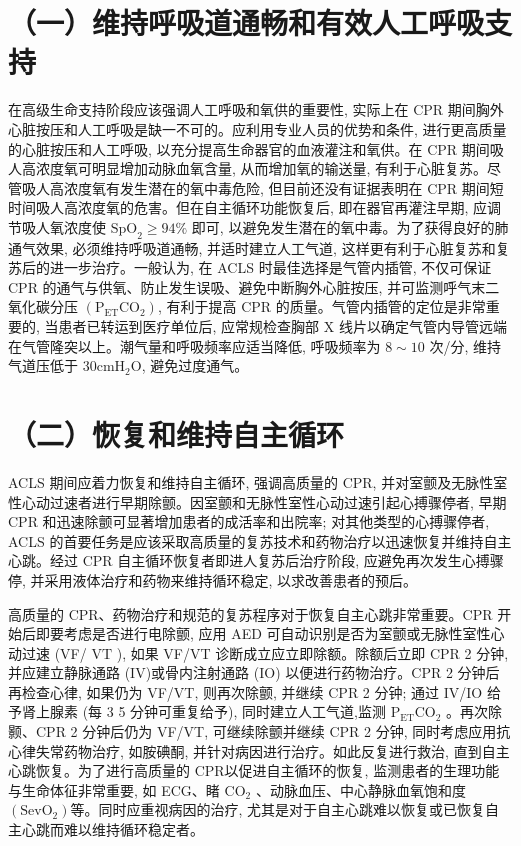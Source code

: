 \documentclass[10pt]{article}
\begin{document}
\section*{（一）维持呼吸道通畅和有效人工呼吸支持}
在高级生命支持阶段应该强调人工呼吸和氧供的重要性, 实际上在 CPR 期间胸外心脏按压和人工呼吸是缺一不可的。应利用专业人员的优势和条件, 进行更高质量的心脏按压和人工呼吸, 以充分提高生命器官的血液灌注和氧供。在 CPR 期间吸人高浓度氧可明显增加动脉血氧含量, 从而增加氧的输送量, 有利于心脏复苏。尽管吸人高浓度氧有发生潜在的氧中毒危险, 但目前还没有证据表明在 CPR 期间短时间吸人高浓度氧的危害。但在自主循环功能恢复后, 即在器官再灌注早期, 应调节吸人氧浓度使 $\mathrm{SpO}_{2} \geqslant 94 \%$ 即可, 以避免发生潜在的氧中毒。为了获得良好的肺通气效果, 必须维持呼吸道通畅, 并适时建立人工气道, 这样更有利于心脏复苏和复苏后的进一步治疗。一般认为, 在 ACLS 时最佳选择是气管内插管, 不仅可保证 CPR 的通气与供氧、防止发生误吸、避免中断胸外心脏按压, 并可监测呼气末二氧化碳分压 $\left(\mathrm{P}_{\mathrm{ET}} \mathrm{CO}_{2}\right)$, 有利于提高 $\mathrm{CPR}$ 的质量。气管内插管的定位是非常重要的, 当患者已转运到医疗单位后, 应常规检查胸部 $\mathrm{X}$ 线片以确定气管内导管远端在气管隆突以上。潮气量和呼吸频率应适当降低, 呼吸频率为 $8 \sim 10$ 次/分, 维持气道压低于 $30 \mathrm{cmH}_{2} \mathrm{O}$, 避免过度通气。

\section*{（二）恢复和维持自主循环}
ACLS 期间应着力恢复和维持自主循环, 强调高质量的 CPR, 并对室颤及无脉性室性心动过速者进行早期除颤。因室颤和无脉性室性心动过速引起心搏骤停者, 早期 CPR 和迅速除颤可显著增加患者的成活率和出院率; 对其他类型的心搏骤停者, ACLS 的首要任务是应该采取高质量的复苏技术和药物治疗以迅速恢复并维持自主心跳。经过 CPR 自主循环恢复者即进人复苏后治疗阶段, 应避免再次发生心搏骤停, 并采用液体治疗和药物来维持循环稳定, 以求改善患者的预后。

高质量的 CPR、药物治疗和规范的复苏程序对于恢复自主心跳非常重要。CPR 开始后即要考虑是否进行电除颤, 应用 AED 可自动识别是否为室颤或无脉性室性心动过速 (VF/ $\mathrm{VT}$ ), 如果 VF/VT 诊断成立应立即除额。除额后立即 CPR 2 分钟, 并应建立静脉通路 (IV)或骨内注射通路 (IO) 以便进行药物治疗。CPR 2 分钟后再检查心律, 如果仍为 VF/VT, 则再次除颤, 并继续 CPR 2 分钟; 通过 IV/IO 给予肾上腺素 (每 3 5 分钟可重复给予), 同时建立人工气道,监测 $\mathrm{P}_{\mathrm{ET}} \mathrm{CO}_{2}$ 。再次除颢、CPR 2 分钟后仍为 VF/VT, 可继续除颤并继续 CPR 2 分钟, 同时考虑应用抗心律失常药物治疗, 如胺碘酮, 并针对病因进行治疗。如此反复进行救治, 直到自主心跳恢复。为了进行高质量的 CPR以促进自主循环的恢复, 监测患者的生理功能与生命体征非常重要, 如 ECG、睹 $\mathrm{CO}_{2}$ 、动脉血压、中心静脉血氧饱和度 $\left(\mathrm{SevO}_{2}\right)$等。同时应重视病因的治疗, 尤其是对于自主心跳难以恢复或已恢复自主心跳而难以维持循环稳定者。
\end{document}
